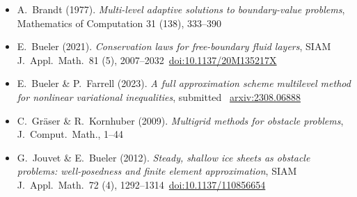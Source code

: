 
\newcommand{\sdoi}[1]{\,{\tiny \href{https://doi.org/#1}{doi:#1}}}
\begin{itemize}
\item A.~Brandt (1977). \emph{Multi-level adaptive solutions to boundary-value problems}, Mathematics of Computation 31 (138), 333--390
\item E.~Bueler (2021). \emph{Conservation laws for free-boundary fluid layers}, SIAM J.~Appl.~Math.~81 (5), 2007--2032 \sdoi{10.1137/20M135217X}
\item E.~Bueler \& P.~Farrell (2023).  \emph{A full approximation scheme multilevel method for nonlinear variational inequalities}, submitted \, {\tiny \href{https://arxiv.org/abs/2308.06888}{arxiv:2308.06888}}
\item C.~Gr{\"a}ser \& R.~Kornhuber (2009). \emph{Multigrid methods for obstacle problems}, J.~Comput.~Math., 1--44
\item G.~Jouvet \& E.~Bueler (2012). \emph{Steady, shallow ice sheets as obstacle problems: well-posedness and finite element approximation}, SIAM J.~Appl.~Math.~72 (4), 1292--1314 \sdoi{10.1137/110856654}

\end{itemize}
